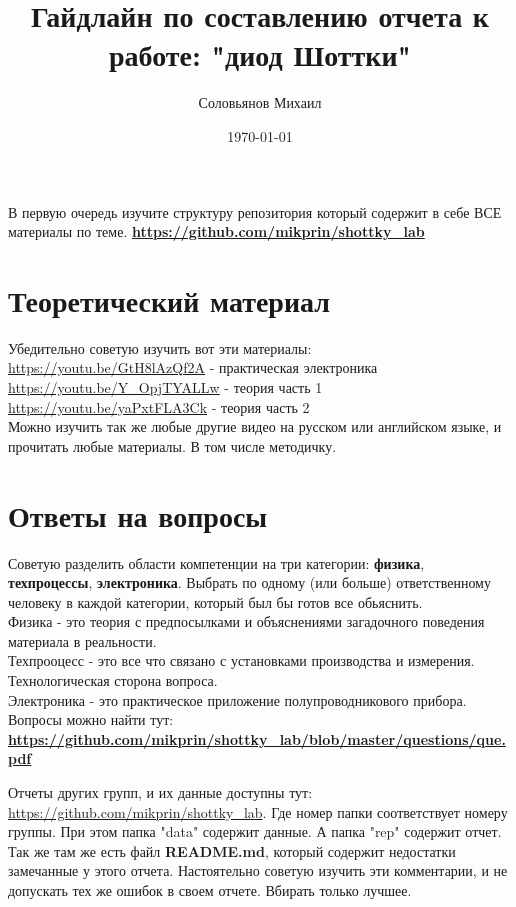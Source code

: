 \documentclass[a4paper,12pt]{article} %
\author{Соловьянов Михаил}
\title{Гайдлайн по составлению отчета к работе: "диод Шоттки"}
\date{\today}
\begin{document}
\maketitle


В первую очередь изучите структуру репозитория который содержит в себе ВСЕ материалы по теме. \textbf{\url{https://github.com/mikprin/shottky_lab}}

\section{Теоретический материал}

Убедительно советую изучить вот эти материалы:\\

\url{https://youtu.be/GtH8lAzQf2A}  - практическая электроника\\
\url{https://youtu.be/Y_OpjTYALLw} - теория часть 1\\
\url{https://youtu.be/yaPxtFLA3Ck} - теория часть 2\\

Можно изучить так же любые другие видео на русском или английском языке, и прочитать любые материалы. В том числе методичку.
\section{Ответы на вопросы}
Советую разделить области компетенции на три категории: \textbf{физика}, \textbf{техпроцессы}, \textbf{электроника}. Выбрать по одному (или больше) ответственному человеку в каждой категории, который был бы готов все обьяснить.\\
Физика - это теория с предпосылками и объяснениями загадочного поведения материала в реальности.\\
Техпрооцесс - это все что связано с установками производства и измерения. Технологическая сторона вопроса.\\
Электроника - это практическое приложение полупроводникового прибора.\\

Вопросы можно найти тут: \textbf{\url{https://github.com/mikprin/shottky_lab/blob/master/questions/que.pdf}}

Отчеты других групп, и их данные доступны тут: \url{https://github.com/mikprin/shottky_lab}. Где номер папки соответствует номеру группы. При этом папка "data" содержит данные. А папка "rep" содержит отчет. Так же там же есть файл \textbf{README.md}, который содержит недостатки замечанные у этого отчета. Настоятельно советую изучить эти комментарии, и не допускать тех же ошибок в своем отчете. Вбирать только лучшее.
\end{document}
